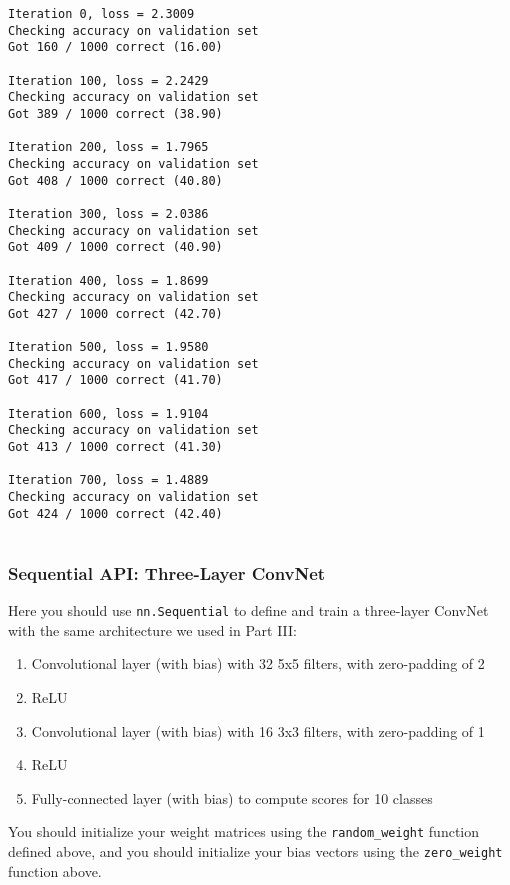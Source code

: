 \documentclass[11pt]{article}
\providecommand{\tightlist}{%
      \setlength{\itemsep}{0pt}\setlength{\parskip}{0pt}}
\begin{document}
    \begin{Verbatim}[commandchars=\\\{\}]
Iteration 0, loss = 2.3009
Checking accuracy on validation set
Got 160 / 1000 correct (16.00)

Iteration 100, loss = 2.2429
Checking accuracy on validation set
Got 389 / 1000 correct (38.90)

Iteration 200, loss = 1.7965
Checking accuracy on validation set
Got 408 / 1000 correct (40.80)

Iteration 300, loss = 2.0386
Checking accuracy on validation set
Got 409 / 1000 correct (40.90)

Iteration 400, loss = 1.8699
Checking accuracy on validation set
Got 427 / 1000 correct (42.70)

Iteration 500, loss = 1.9580
Checking accuracy on validation set
Got 417 / 1000 correct (41.70)

Iteration 600, loss = 1.9104
Checking accuracy on validation set
Got 413 / 1000 correct (41.30)

Iteration 700, loss = 1.4889
Checking accuracy on validation set
Got 424 / 1000 correct (42.40)


    \end{Verbatim}

    \subsubsection{Sequential API: Three-Layer
ConvNet}\label{sequential-api-three-layer-convnet}

Here you should use \texttt{nn.Sequential} to define and train a
three-layer ConvNet with the same architecture we used in Part III:

\begin{enumerate}
\def\labelenumi{\arabic{enumi}.}
\tightlist
\item
  Convolutional layer (with bias) with 32 5x5 filters, with zero-padding
  of 2
\item
  ReLU
\item
  Convolutional layer (with bias) with 16 3x3 filters, with zero-padding
  of 1
\item
  ReLU
\item
  Fully-connected layer (with bias) to compute scores for 10 classes
\end{enumerate}

You should initialize your weight matrices using the
\texttt{random\_weight} function defined above, and you should
initialize your bias vectors using the \texttt{zero\_weight} function
above.
\end{document}
